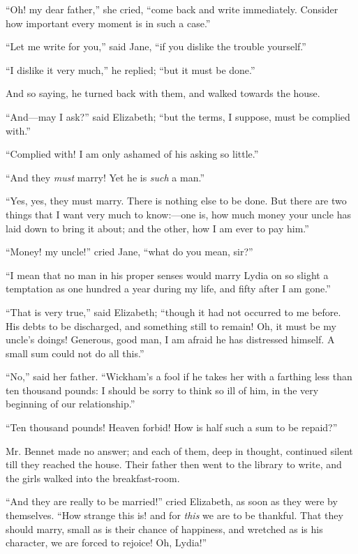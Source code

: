 \documentclass[12pt]{book}
\begin{document}
``Oh! my dear father,'' she cried, ``come back and write immediately. Consider how important every moment is in such a case.''

``Let me write for you,'' said Jane, ``if you dislike the trouble yourself.''

``I dislike it very much,'' he replied; ``but it must be done.''

And so saying, he turned back with them, and walked towards the house.

``And---may I ask?'' said Elizabeth; ``but the terms, I suppose, must be complied with.''

``Complied with! I am only ashamed of his asking so little.''

``And they \textit{must} marry! Yet he is \textit{such} a man.''

``Yes, yes, they must marry. There is nothing else to be done. But there are two things that I want very much to know:---one is, how much money your uncle has laid down to bring it about; and the other, how I am ever to pay him.''

``Money! my uncle!'' cried Jane, ``what do you mean, sir?''

``I mean that no man in his proper senses would marry Lydia on so slight a temptation as one hundred a year during my life, and fifty after I am gone.''

``That is very true,'' said Elizabeth; ``though it had not occurred to me before. His debts to be discharged, and something still to remain! Oh, it must be my uncle's doings! Generous, good man, I am afraid he has distressed himself. A small sum could not do all this.''

``No,'' said her father. ``Wickham's a fool if he takes her with a farthing less than ten thousand pounds: I should be sorry to think so ill of him, in the very beginning of our relationship.''

``Ten thousand pounds! Heaven forbid! How is half such a sum to be repaid?''

Mr. Bennet made no answer; and each of them, deep in thought, continued silent till they reached the house. Their father then went to the library to write, and the girls walked into the breakfast-room.

``And they are really to be married!'' cried Elizabeth, as soon as they were by themselves. ``How strange this is! and for \textit{this} we are to be thankful. That they should marry, small as is their chance of happiness, and wretched as is his character, we are forced to rejoice! Oh, Lydia!''
\end{document}
